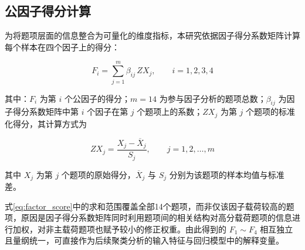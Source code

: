 \subsection{公因子得分计算}

为将题项层面的信息整合为可量化的维度指标，本研究依据因子得分系数矩阵计算每个样本在四个因子上的得分：

\begin{equation}
F_i=\sum_{j=1}^{m}\beta_{ij}\,ZX_j,\qquad i=1,2,3,4
\label{eq:factor_score}
\end{equation}

其中：$F_i$ 为第 $i$ 个公因子的得分；$m=14$ 为参与因子分析的题项总数；$\beta_{ij}$ 为因子得分系数矩阵中第 $i$ 个因子在第 $j$ 个题项上的系数；$ZX_j$ 为第 $j$ 个题项的标准化得分，其计算方式为

\begin{equation}
ZX_j=\frac{X_j-\overline{X}_j}{S_j},\qquad j=1,2,\dots,m
\label{eq:standardize}
\end{equation}

其中 $X_j$ 为第 $j$ 个题项的原始得分，$\overline{X}_j$ 与 $S_j$ 分别为该题项的样本均值与标准差。

式\eqref{eq:factor_score}中的求和范围覆盖全部14个题项，而非仅该因子载荷较高的题项，原因是因子得分系数矩阵同时利用题项间的相关结构对高分载荷题项的信息进行加权，对非主载荷题项也赋予较小的修正权重。由此得到的 $F_1\sim F_4$ 相互独立且量纲统一，可直接作为后续聚类分析的输入特征与回归模型中的解释变量。

